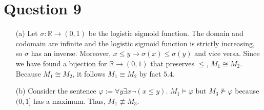 \documentclass[10pt]{article}
\begin{document}
\section*{Question 9}
\begin{itemize}
    \item [(a)] Let $\sigma: \mathbb{R}\rightarrow (0,1)$ be the logistic sigmoid function.  
    The domain and codomain are infinite and the logistic sigmoid function is strictly increasing, so $\sigma$ has an inverse. 
    Moreover, $x\le y\rightarrow \sigma(x)\le\sigma(y)$ and vice versa.
    Since we have found a bijection for $\mathbb{R}\rightarrow(0,1)$ that preserves $\le$, $M_1\cong M_2$. Because $M_1\cong M_2$, it follows $M_1\equiv M_2$ by fact $5.4$.
    \item [(b)] Consider the sentence $\varphi:=\forall y\exists x\lnot(x\le y)$. $M_1\models\varphi$ but $M_3\not\models\varphi$ because $(0,1]$ has a maximum. Thus, $M_1\not\equiv M_3$.
\end{itemize}
\end{document}
